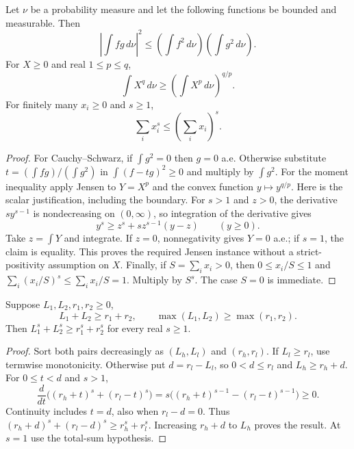 \begin{lemma}
\label{lem:moment-basics}
\proved Let $\nu$ be a probability measure and let the following functions be bounded and
measurable.  Then
\[
 \left|\int fg\,d\nu\right|^2
 \le\left(\int f^2\,d\nu\right)\left(\int g^2\,d\nu\right).
\]
For $X\ge0$ and real $1\le p\le q$,
\[
 \int X^q\,d\nu\ge\left(\int X^p\,d\nu\right)^{q/p}.
\]
For finitely many $x_i\ge0$ and $s\ge1$,
\[
 \sum_i x_i^s\le\left(\sum_i x_i\right)^s.
\]
\end{lemma}
\begin{proof}
For Cauchy--Schwarz, if $\int g^2=0$ then $g=0$ a.e.  Otherwise substitute
$t=(\int fg)/(\int g^2)$ in $\int(f-tg)^2\ge0$ and multiply by $\int g^2$.
For the moment inequality apply Jensen to $Y=X^p$ and the convex function $y\mapsto y^{q/p}$.
Here is the scalar justification, including the boundary.  For $s>1$ and $z>0$, the derivative
$s y^{s-1}$ is nondecreasing on $(0,\infty)$, so integration of the derivative gives
\[
 y^s\ge z^s+s z^{s-1}(y-z)\qquad(y\ge0).
\]
Take $z=\int Y$ and integrate.  If $z=0$, nonnegativity gives $Y=0$ a.e.; if $s=1$, the claim
is equality.  This proves the required Jensen instance without a strict-positivity assumption
on $X$.  Finally, if $S=\sum_i x_i>0$, then $0\le x_i/S\le1$ and
$\sum_i(x_i/S)^s\le\sum_i x_i/S=1$.  Multiply by $S^s$.  The case $S=0$ is immediate.
\end{proof}

\begin{lemma}
\label{lem:pair-majorization}
\proved Suppose $L_1,L_2,r_1,r_2\ge0$,
\[
 L_1+L_2\ge r_1+r_2,\qquad
 \max(L_1,L_2)\ge\max(r_1,r_2).
\]
Then $L_1^s+L_2^s\ge r_1^s+r_2^s$ for every real $s\ge1$.
\end{lemma}
\begin{proof}
Sort both pairs decreasingly as $(L_h,L_l)$ and $(r_h,r_l)$.  If $L_l\ge r_l$, use
termwise monotonicity.  Otherwise put $d=r_l-L_l$, so $0<d\le r_l$ and
$L_h\ge r_h+d$.  For $0\le t<d$ and $s>1$,
\[
 \frac{d}{dt}\bigl((r_h+t)^s+(r_l-t)^s\bigr)
 =s\bigl((r_h+t)^{s-1}-(r_l-t)^{s-1}\bigr)\ge0.
\]
Continuity includes $t=d$, also when $r_l-d=0$.  Thus
$(r_h+d)^s+(r_l-d)^s\ge r_h^s+r_l^s$.  Increasing $r_h+d$ to $L_h$ proves the result.
At $s=1$ use the total-sum hypothesis.
\end{proof}

